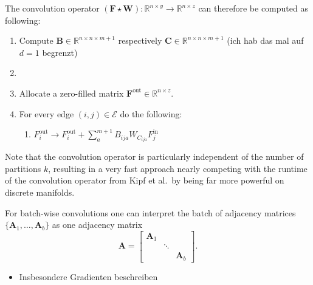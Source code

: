 \documentclass[pdftex,10pt,a4paper]{scrartcl}
\begin{document}
The convolution operator $(\mathbf{F} \star \mathbf{W}) \colon \mathbb{R}^{n \times y} \to \mathbb{R}^{n \times z}$ can therefore be computed as following:
\begin{enumerate}
  \item Compute $\mathbf{B} \in \mathbb{R}^{n \times n \times m + 1}$ respectively $\mathbf{C} \in \mathbb{R}^{n \times n \times m + 1}$ (ich hab das mal auf $d = 1$ begrenzt)
  \item
  \item Allocate a zero-filled matrix $\mathbf{F}^{\mathrm{out}} \in \mathbb{R}^{n \times z}$.
  \item For every edge $(i, j) \in \mathcal{E}$ do the following:
  \begin{enumerate}
    \item $F^{\mathrm{out}}_i \rightarrow F^{\mathrm{out}}_i + \sum_a^{m+1} B_{ija} W_{C_{ija}} F^{\mathrm{in}}_j$
  \end{enumerate}
\end{enumerate}
Note that the convolution operator is particularly independent of the number of partitions $k$, resulting in a very fast approach nearly competing with the runtime of the convolution operator from Kipf et al.\ by being far more powerful on discrete manifolds.

For batch-wise convolutions one can interpret the batch of adjacency matrices $\{ \mathbf{A}_1, \ldots, \mathbf{A}_b \}$ as one adjacency matrix
\begin{equation*}
  \mathbf{A} = \begin{bmatrix}
    \mathbf{A}_1 & & \\
    & \ddots &  \\
    & & \mathbf{A}_b
  \end{bmatrix}.
\end{equation*}









\newpage


\begin{itemize}
  \item Insbesondere Gradienten beschreiben
\end{itemize}
\end{document}
